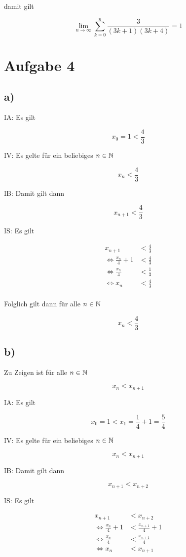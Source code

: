 \documentclass[a4paper, 11pt]{article}
\begin{document}
damit gilt

$$ \lim_{n \rightarrow \infty} \sum_{k = 0}^{n} \frac{3}{(3k + 1)(3k + 4)} = 1 $$

\section{Aufgabe 4}
\label{sec:org71c0e09}
\subsection{a)}
\label{sec:org8bb9735}
IA: Es gilt

$$ x_0 = 1 < \frac{4}{3} $$

IV: Es gelte für ein beliebiges \(n \in \mathbb{N}\)

$$ x_n < \frac{4}{3} $$

IB: Damit gilt dann

$$ x_{n+1} < \frac{4}{3} $$

IS: Es gilt

\begin{align*}
    x_{n+1} &< \frac{4}{3} \\
    \Leftrightarrow \frac{x_n}{4} + 1 &< \frac{4}{3} \\
    \Leftrightarrow \frac{x_n}{4} &< \frac{1}{3} \\
    \Leftrightarrow x_n &< \frac{4}{3} \\
\end{align*}

Folglich gilt dann für alle \(n \in \mathbb{N}\)

$$ x_n < \frac{4}{3} $$

\subsection{b)}
\label{sec:org1addee1}
Zu Zeigen ist für alle \(n \in \mathbb{N}\)

$$ x_n < x_{n+1} $$

IA: Es gilt

$$ x_0 = 1 < x_1 = \frac{1}{4} + 1 = \frac{5}{4} $$

IV: Es gelte für ein beliebiges \(n \in \mathbb{N}\)

$$ x_n < x_{n+1} $$

IB: Damit gilt dann

$$ x_{n+1} < x_{n+2} $$

IS: Es gilt

\begin{align*}
    x_{n+1} &< x_{n+2} \\
    \Leftrightarrow \frac{x_n}{4} + 1 &< \frac{x_{n+1}}{4} + 1 \\
    \Leftrightarrow \frac{x_n}{4} &< \frac{x_{n+1}}{4} \\
    \Leftrightarrow x_n &< x_{n+1} \\
\end{align*}
\end{document}
